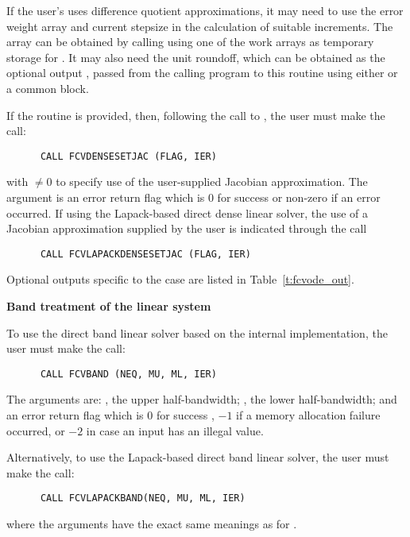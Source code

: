 \begin{Steps}
  If the user's  uses difference quotient approximations, it
  may need to use the error weight array  and current stepsize 
  in the calculation of suitable increments.  The array  can be
  obtained by calling  using one of the work arrays as
  temporary storage for .  It may also need the unit roundoff,
  which can be obtained as the optional output , passed from
  the calling program to this routine using either  or a common block.

  If the  routine is provided, then, following the call to , 
  the user must make the call:
\begin{verbatim}
      CALL FCVDENSESETJAC (FLAG, IER)
\end{verbatim}
  with  $\neq 0$ to specify use of the user-supplied Jacobian
  approximation.  The argument  is an error return flag which is $0$ 
  for success or non-zero if an error occurred.
  If using the Lapack-based direct dense linear solver, the use of a
  Jacobian approximation supplied by the user is indicated through the call
\begin{verbatim}
      CALL FCVLAPACKDENSESETJAC (FLAG, IER)
\end{verbatim}

  Optional outputs specific to the {\dense} case are listed in
  Table~\ref{t:fcvode_out}.


  {\s} {\bf Band treatment of the linear system}
  
  To use the direct band linear solver based on the internal {\cvode}
  implementation, the user must make the call:
\begin{verbatim}
      CALL FCVBAND (NEQ, MU, ML, IER)
\end{verbatim}
  The arguments are: , the upper half-bandwidth; , 
  the lower half-bandwidth; and  an error return flag which is 
  $0$ for success , $-1$ if a memory allocation failure occurred, or $-2$ 
  in case an input has an illegal value.     
  
  Alternatively, to use the Lapack-based direct band linear solver, 
  the user must make the call:
\begin{verbatim}
      CALL FCVLAPACKBAND(NEQ, MU, ML, IER)
\end{verbatim}
  where the arguments have the exact same meanings as for .


\end{Steps}
